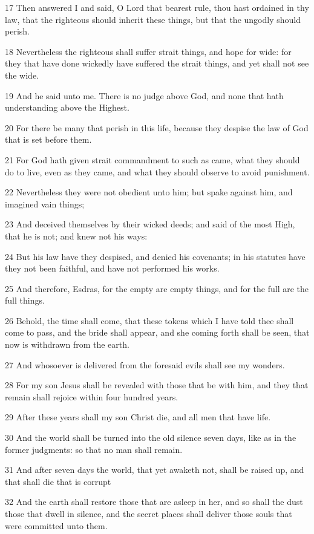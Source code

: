 \par 17 Then answered I and said, O Lord that bearest rule, thou hast ordained in thy law, that the righteous should inherit these things, but that the ungodly should perish.
\par 18 Nevertheless the righteous shall suffer strait things, and hope for wide: for they that have done wickedly have suffered the strait things, and yet shall not see the wide.
\par 19 And he said unto me. There is no judge above God, and none that hath understanding above the Highest.
\par 20 For there be many that perish in this life, because they despise the law of God that is set before them.
\par 21 For God hath given strait commandment to such as came, what they should do to live, even as they came, and what they should observe to avoid punishment.
\par 22 Nevertheless they were not obedient unto him; but spake against him, and imagined vain things;
\par 23 And deceived themselves by their wicked deeds; and said of the most High, that he is not; and knew not his ways:
\par 24 But his law have they despised, and denied his covenants; in his statutes have they not been faithful, and have not performed his works.
\par 25 And therefore, Esdras, for the empty are empty things, and for the full are the full things.
\par 26 Behold, the time shall come, that these tokens which I have told thee shall come to pass, and the bride shall appear, and she coming forth shall be seen, that now is withdrawn from the earth.
\par 27 And whosoever is delivered from the foresaid evils shall see my wonders.
\par 28 For my son Jesus shall be revealed with those that be with him, and they that remain shall rejoice within four hundred years.
\par 29 After these years shall my son Christ die, and all men that have life.
\par 30 And the world shall be turned into the old silence seven days, like as in the former judgments: so that no man shall remain.
\par 31 And after seven days the world, that yet awaketh not, shall be raised up, and that shall die that is corrupt
\par 32 And the earth shall restore those that are asleep in her, and so shall the dust those that dwell in silence, and the secret places shall deliver those souls that were committed unto them.

